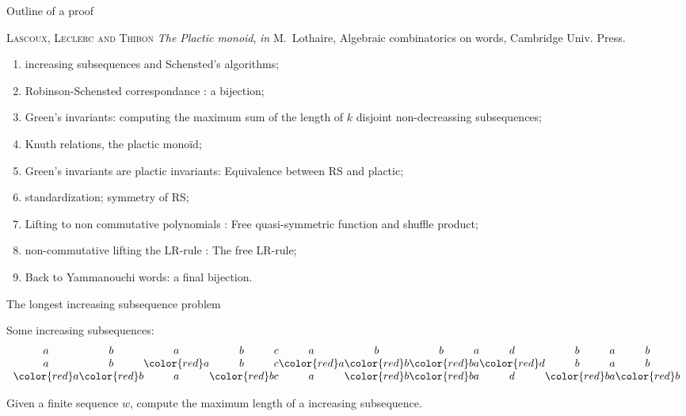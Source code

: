 \documentclass[compress,11pt]{beamer}
\begin{document}
\begin{frame}{Outline of a proof}

  \textsc{\sc Lascoux, Leclerc and Thibon} \textit{The Plactic monoid},
    {\it in} M.~Lothaire, Algebraic combinatorics on words,
    Cambridge Univ. Press.

  \begin{enumerate}
  \item increasing subsequences and Schensted's algorithms;
  \item Robinson-Schensted correspondance : a bijection;
  \item Green's invariants: computing the maximum sum of the length of $k$ disjoint
    non-decreassing subsequences;
  \item Knuth relations, the plactic monoïd;
  \item Green's invariants are plactic invariants: Equivalence between RS and plactic;
  \item standardization; symmetry of RS;
  \item Lifting to non commutative polynomials : Free quasi-symmetric function
    and shuffle product;
  \item non-commutative lifting the LR-rule : The free LR-rule;
  \item Back to Yammanouchi words: a final bijection.
  \end{enumerate}
\end{frame}

\newcommand{\red}[1]{{\color{red} #1}}
\newcommand{\grn}[1]{{\color{green} #1}}
\newcommand{\blu}[1]{{\color{blue} #1}}
\begin{frame}{The longest increasing subsequence problem}

  Some increasing subsequences: 
  \[
  \begin{array}{c@{}c@{}c@{}c@{}c@{}c@{}c@{}c@{}c@{}c@{}c@{}c@{}c}
    a&b&a&b&c&a&b&b&a&d&b&a&b\\
    a&b&\red{a}&b&c&\red a&\red b&\red b&a&\red d&b&a&b \\
    \red a&\red b&a&\red{b}&c&a&\red b&\red b&a&d&\red b&a&\red b
  \end{array}
  \]
  \begin{PROBLEM}[Schensted]
    Given a finite sequence $w$, compute the maximum length of a increasing subsequence.
  \end{PROBLEM}
\end{frame}

\newcommand{\ar}[1]{\xrightarrow{#1}}
\end{document}
